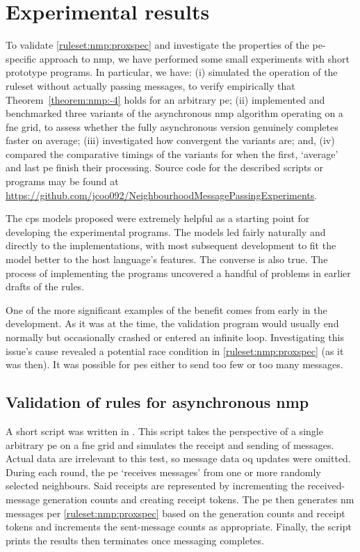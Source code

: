 \section{Experimental results}

To validate \autoref{ruleset:nmp:proxspec} and investigate the properties of the \gls{pe}-specific approach to \gls{nmp}, we have performed some small experiments with short prototype programs.  In particular, we have:  (i) simulated the operation of the ruleset without actually passing messages, to verify empirically that Theorem~\ref{theorem:nmp:-4} holds for an arbitrary \gls{pe};  (ii) implemented and benchmarked three variants of the asynchronous \gls{nmp} algorithm operating on a \gls{fne} grid, to assess whether the fully asynchronous version genuinely completes faster on average; (iii) investigated how convergent the variants are; and, (iv) compared the comparative timings of the variants for when the first, `average' and last \gls{pe} finish their processing.  Source code for the described scripts or programs may be found at \url{https://github.com/jcoo092/NeighbourhoodMessagePassingExperiments}.

The \gls{cps} models proposed were extremely helpful as a starting point for developing the experimental programs.  The models led fairly naturally and directly to the implementations, with most subsequent development to fit the model better to the host language's features.  The converse is also true.  The process of implementing the programs uncovered a handful of problems in earlier drafts of the rules.

One of the more significant examples of the benefit comes from early in the development.  As it was at the time, the validation program would usually end normally but occasionally crashed or entered an infinite loop.  Investigating this issue's cause revealed a potential race condition in \autoref{ruleset:nmp:proxspec} (as it was then).  It was possible for \glspl{pe} either to send too few or too many messages.

\subsection{Validation of rules for asynchronous \texorpdfstring{\acrlong{nmp}}{neighbourhood message passing}}
A short script was written in \fsharp{}.  This script takes the perspective of a single arbitrary \gls{pe} on a \gls{fne} grid and simulates the receipt and sending of messages.  Actual data are irrelevant to this test, so message data \gls{oq} updates were omitted.  During each round, the \gls{pe} `receives messages' from one or more randomly selected neighbours.  Said receipts are represented by incrementing the received-message generation counts and creating receipt tokens.  The \gls{pe} then generates \gls{nm} messages per \autoref{ruleset:nmp:proxspec} based on the generation counts and receipt tokens and increments the sent-message counts as appropriate.  Finally, the script prints the results then terminates once messaging completes.

